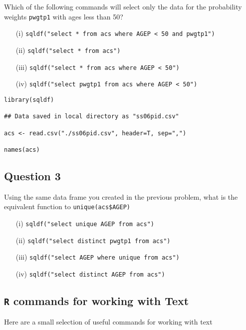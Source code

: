\documentclass[12pt]{article}
\begin{document}
\noindent Which of the following commands will select only the data for the probability weights \texttt{pwgtp1} with ages less than 50?
\begin{itemize}
\item[(i)] \texttt{sqldf("select * from acs where AGEP < 50 and pwgtp1")}
\item[(ii)] \texttt{sqldf("select * from acs")}
\item[(iii)] \texttt{sqldf("select * from acs where AGEP < 50")}
\item[(iv)] \texttt{sqldf("select pwgtp1 from acs where AGEP < 50")}
\end{itemize}

\begin{framed}
\begin{verbatim}
library(sqldf)

## Data saved in local directory as "ss06pid.csv"

acs <- read.csv("./ss06pid.csv", header=T, sep=",")

names(acs)
\end{verbatim}
\end{framed}
\newpage
\subsection*{Question 3}
Using the same data frame you created in the previous problem, what is the equivalent function to \texttt{unique(acs\$AGEP)}
\begin{itemize}
\item[(i)] \texttt{sqldf("select unique AGEP from acs")}
\item[(ii)] \texttt{sqldf("select distinct pwgtp1 from acs")}
\item[(iii)] \texttt{sqldf("select AGEP where unique from acs")}
\item[(iv)] \texttt{sqldf("select distinct AGEP from acs")}
\end{itemize}

\newpage
\subsection*{\texttt{R} commands for working with Text}

Here are a small selection of useful commands for working with text
\end{document}
